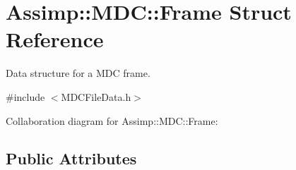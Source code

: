 \hypertarget{struct_assimp_1_1_m_d_c_1_1_frame}{\section{Assimp\+:\+:M\+D\+C\+:\+:Frame Struct Reference}
\label{struct_assimp_1_1_m_d_c_1_1_frame}
}


Data structure for a M\+D\+C frame.  




{\ttfamily \#include $<$M\+D\+C\+File\+Data.\+h$>$}



Collaboration diagram for Assimp\+:\+:M\+D\+C\+:\+:Frame\+:
\subsection*{Public Attributes}
